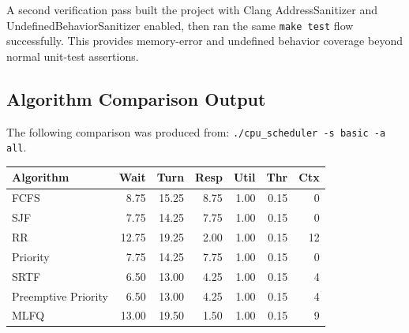 \documentclass[11pt]{article}
\begin{document}
A second verification pass built the project with Clang
AddressSanitizer and UndefinedBehaviorSanitizer enabled, then ran the same
\texttt{make test} flow successfully. This provides memory-error and undefined
behavior coverage beyond normal unit-test assertions.

\subsection{Algorithm Comparison Output}

The following comparison was produced from:
\texttt{./cpu\_scheduler -s basic -a all}.

\begin{center}
\begin{tabular}{lrrrrrr}
\toprule
\textbf{Algorithm} & \textbf{Wait} & \textbf{Turn} & \textbf{Resp} &
\textbf{Util} & \textbf{Thr} & \textbf{Ctx} \\
\midrule
FCFS & 8.75 & 15.25 & 8.75 & 1.00 & 0.15 & 0 \\
SJF & 7.75 & 14.25 & 7.75 & 1.00 & 0.15 & 0 \\
RR & 12.75 & 19.25 & 2.00 & 1.00 & 0.15 & 12 \\
Priority & 7.75 & 14.25 & 7.75 & 1.00 & 0.15 & 0 \\
SRTF & 6.50 & 13.00 & 4.25 & 1.00 & 0.15 & 4 \\
Preemptive Priority & 6.50 & 13.00 & 4.25 & 1.00 & 0.15 & 4 \\
MLFQ & 13.00 & 19.50 & 1.50 & 1.00 & 0.15 & 9 \\
\bottomrule
\end{tabular}
\end{center}
\end{document}
